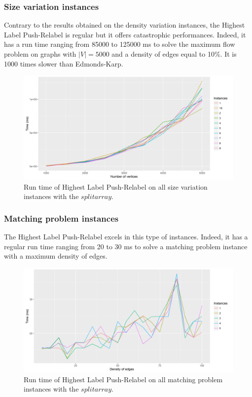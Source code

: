 \subsubsection{Size variation instances}
Contrary to the results obtained on the density variation instances, the Highest Label Push-Relabel is regular but it offers catastrophic performances. Indeed, it has a run time ranging from 85000 to 125000 ms to solve the maximum flow problem on graphs with $|V|=5000$ and a density of edges equal to 10\%. It is 1000 times slower than Edmonds-Karp.
\begin{figure}[H]
\begin{center}
\includegraphics[scale=0.5]{images/results/HLPRmean.png}
\caption{Run time of Highest Label Push-Relabel on all size variation instances with the $split array$.}
\label{fig:HLPRmean}
\end{center}
\end{figure}
\subsubsection{Matching problem instances}
The Highest Label Push-Relabel excels in this type of instances. Indeed, it has a regular run time ranging from 20 to 30 ms to solve a matching problem instance with a maximum density of edges.
\begin{figure}[H]
\begin{center}
\includegraphics[scale=0.5]{images/results/prmatching.png}
\caption{Run time of Highest Label Push-Relabel on all matching problem instances with the $split array$.}
\label{fig:prmatching}
\end{center}
\end{figure}

